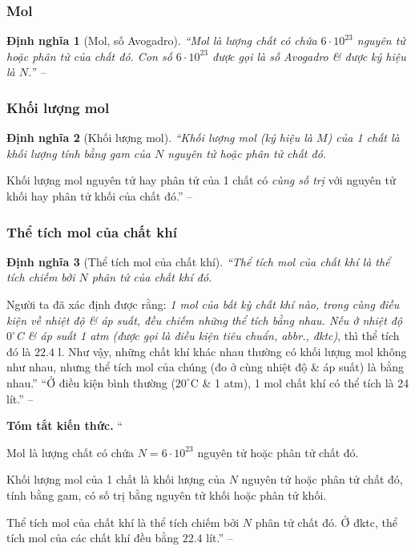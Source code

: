 \documentclass{article}
\numberwithin{equation}{section}
\newtheorem{dinhnghia}{Định nghĩa}[section]
\begin{document}
\subsubsection{Mol}

\begin{dinhnghia}[Mol, số Avogadro]
	``\emph{Mol} là lượng chất có chứa $6\cdot 10^{23}$ nguyên tử hoặc phân tử của chất đó. Con số $6\cdot 10^{23}$ được gọi là \emph{số Avogadro} \& được ký hiệu là $N$.'' -- \cite[p. 63]{SGK_Hoa_Hoc_8}
\end{dinhnghia}

\subsubsection{Khối lượng mol}

\begin{dinhnghia}[Khối lượng mol]
	``\emph{Khối lượng mol} (ký hiệu là $M$) của 1 chất là khối lượng tính bằng gam của $N$ nguyên tử hoặc phân tử chất đó.
\end{dinhnghia}
Khối lượng mol nguyên tử hay phân tử của 1 chất có \textit{cùng số trị} với nguyên tử khối hay phân tử khối của chất đó.'' -- \cite[p. 63]{SGK_Hoa_Hoc_8}

\subsubsection{Thể tích mol của chất khí}

\begin{dinhnghia}[Thể tích mol của chất khí]
	``\emph{Thể tích mol của chất khí} là thể tích chiếm bởi $N$ phân tử của chất khí đó.
\end{dinhnghia}
Người ta đã xác định được rằng: \textit{1 mol của bất kỳ chất khí nào, trong cùng điều kiện về nhiệt độ \& áp suất, đều chiếm những thể tích bằng nhau. Nếu ở nhiệt độ $0^\circ$C \& áp suất 1 atm (được gọi là \emph{điều kiện tiêu chuẩn}, abbr., \emph{đktc})}, thì thể tích đó là $22.4$ l. Như vậy, những chất khí khác nhau thường có khối lượng mol không như nhau, nhưng thể tích mol của chúng (đo ở cùng nhiệt độ \& áp suất) là bằng nhau.'' ``Ở điều kiện bình thường ($20^\circ$C \& 1 atm), 1 mol chất khí có thể tích là 24 lít.'' -- \cite[pp. 63--64]{SGK_Hoa_Hoc_8}
\vspace{2mm}

\noindent\textbf{Tóm tắt kiến thức.}
``\begin{enumerate*}
	\item[\textbf{1.}] Mol là lượng chất có chứa $N = 6\cdot 10^{23}$ nguyên tử hoặc phân tử chất đó.
	\item[\textbf{2.}] Khối lượng mol của 1 chất là khối lượng của $N$ nguyên tử hoặc phân tử chất đó, tính bằng gam, có số trị bằng nguyên tử khối hoặc phân tử khối.
	\item[\textbf{3.}] Thể tích mol của chất khí là thể tích chiếm bởi $N$ phân tử chất đó. Ở đktc, thể tích mol của các chất khí đều bằng $22.4$ lít.'' -- \cite[p. 64]{SGK_Hoa_Hoc_8}
\end{enumerate*}
\end{document}
